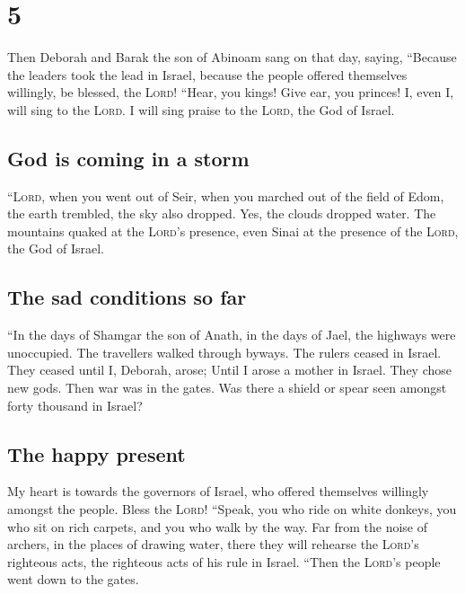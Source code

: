 \hypertarget{section-4}{%
\section{5}\label{section-4}}

 Then Deborah and Barak the son of Abinoam sang on that
day, saying,  ``Because the leaders took the lead in
Israel, because the people offered themselves willingly, be blessed, the
\textsc{Lord}!  ``Hear, you kings! Give ear, you princes!
I, even I, will sing to the \textsc{Lord}. I will sing praise to the
\textsc{Lord}, the God of Israel.

\hypertarget{god-is-coming-in-a-storm}{%
\subsection{God is coming in a storm}\label{god-is-coming-in-a-storm}}

 ``\textsc{Lord}, when you went out of Seir, when you
marched out of the field of Edom, the earth trembled, the sky also
dropped. Yes, the clouds dropped water.  The mountains
quaked at the \textsc{Lord}'s presence, even Sinai at the presence of
the \textsc{Lord}, the God of Israel.

\hypertarget{the-sad-conditions-so-far}{%
\subsection{The sad conditions so far}\label{the-sad-conditions-so-far}}

 ``In the days of Shamgar the son of Anath, in the days of
Jael, the highways were unoccupied. The travellers walked through
byways.  The rulers ceased in Israel. They ceased until I,
Deborah, arose; Until I arose a mother in Israel.  They
chose new gods. Then war was in the gates. Was there a shield or spear
seen amongst forty thousand in Israel?

\hypertarget{the-happy-present}{%
\subsection{The happy present}\label{the-happy-present}}

 My heart is towards the governors of Israel, who offered
themselves willingly amongst the people. Bless the \textsc{Lord}!
 ``Speak, you who ride on white donkeys, you who sit on
rich carpets, and you who walk by the way.  Far from the
noise of archers, in the places of drawing water, there they will
rehearse the \textsc{Lord}'s righteous acts, the righteous acts of his
rule in Israel. ``Then the \textsc{Lord}'s people went down to the
gates.

